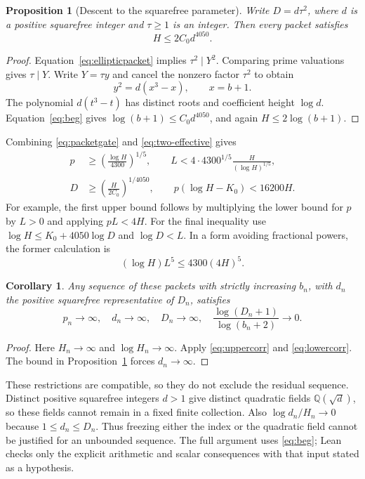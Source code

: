 \documentclass[11pt]{amsart}
\newtheorem{proposition}[theorem]{Proposition}
\newtheorem{corollary}[theorem]{Corollary}
\theoremstyle{definition}
\theoremstyle{remark}
\newcommand{\Q}{\mathbb Q}
\begin{document}
\begin{proposition}[Descent to the squarefree parameter]\label{prop:descent}
Write $D=d\tau^2$, where $d$ is a positive squarefree integer and
$\tau\ge1$ is an integer. Then every packet satisfies
\[
 H\le2C_0d^{4050}.
\]
\end{proposition}
\begin{proof}
Equation~\eqref{eq:ellipticpacket} implies $\tau^2\mid Y^2$.
Comparing prime valuations gives $\tau\mid Y$. Write $Y=\tau y$ and
cancel the nonzero factor $\tau^2$ to obtain
\[
 y^2=d(x^3-x),\qquad x=b+1.
\]
The polynomial $d(t^3-t)$ has distinct roots and coefficient height
$\log d$. Equation~\eqref{eq:beg} gives
$\log(b+1)\le C_0d^{4050}$, and again $H\le2\log(b+1)$.
\end{proof}

Combining \eqref{eq:packetgate} and \eqref{eq:two-effective} gives
\begin{align}
 p&\ge\left(\frac{\log H}{4300}\right)^{1/5},\qquad
 L<4\cdot4300^{1/5}\frac{H}{(\log H)^{1/5}},\label{eq:uppercorr}\\
 D&\ge\left(\frac{H}{2C_0}\right)^{1/4050},\qquad
 p(\log H-K_0)<16200H.\label{eq:lowercorr}
\end{align}
For example, the first upper bound follows by multiplying the lower bound
for $p$ by $L>0$ and applying $pL<4H$.
For the final inequality use
$\log H\le K_0+4050\log D$ and $\log D<L$.
In a form avoiding fractional powers, the former calculation is
\[
 (\log H)L^5\le4300(4H)^5.
\]

\begin{corollary}\label{cor:residualsequence}
Any sequence of these packets with strictly increasing $b_n$, with $d_n$
the positive squarefree representative of $D_n$, satisfies
\[
 p_n\longrightarrow\infty,\quad d_n\longrightarrow\infty,
 \quad D_n\longrightarrow\infty,
 \quad\frac{\log(D_n+1)}{\log(b_n+2)}\longrightarrow0.
\]
\end{corollary}
\begin{proof}
Here $H_n\to\infty$ and $\log H_n\to\infty$.
Apply \eqref{eq:uppercorr} and \eqref{eq:lowercorr}.
The bound in Proposition~\ref{prop:descent} forces $d_n\to\infty$.
\end{proof}

These restrictions are compatible, so they do not exclude the residual
sequence. Distinct positive squarefree integers $d>1$ give distinct
quadratic fields $\Q(\sqrt d)$, so these fields cannot remain in a fixed
finite collection.
Also $\log d_n/H_n\to0$ because $1\le d_n\le D_n$.
Thus freezing either the index or the quadratic field cannot be justified
for an unbounded sequence. The full argument
uses \eqref{eq:beg}; Lean checks only the explicit arithmetic and scalar
consequences with that input stated as a hypothesis.
\end{document}
